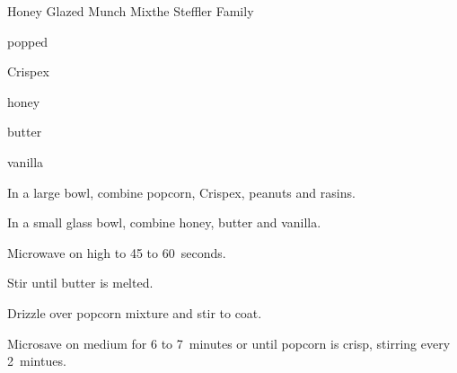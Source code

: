 \begin{recipe}{Honey Glazed Munch Mix}{the Steffler Family}{}

\begin{ingredients}
\item {} popped 
\item {} Crispex 
\item \C{\half} 
\item \C{\quarter} 
\item \C{\quarter} honey
\item \C{\quarter} butter
\item \tp{\quarter} vanilla
\end{ingredients}

\begin{directions}
\item In a large bowl, combine popcorn, Crispex, peanuts and rasins.
\item In a small glass bowl, combine honey, butter and vanilla.
\item Microwave on high to 45 to 60~seconds.
\item Stir until butter is melted.
\item Drizzle over popcorn mixture and stir to coat.
\item Microsave on medium for 6 to 7~minutes or until popcorn is crisp, stirring every 2~mintues.
\end{directions}
\end{recipe}
